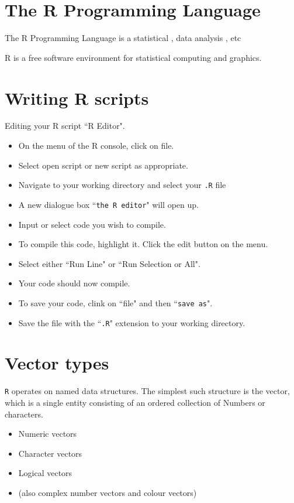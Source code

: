 \documentclass[a4paper,12pt]{article}
\begin{document}
\tableofcontents
\newpage
\section{The R Programming Language}

The R Programming Language is a statistical , data analysis , etc

R is a free software environment for statistical computing and graphics.

\section{Writing R scripts}
Editing your R script ``R Editor".
\begin{itemize}
\item On the menu of the R console, click on file.
\item Select open script or new script as appropriate.
\item Navigate to your working directory and select your \texttt{.R} file
\item A new dialogue box ``\texttt{the R editor}" will open up.
\item Input or select code you wish to compile.
\item To compile this code, highlight it. Click the edit button on the menu.
\item Select either ``Run Line" or ``Run Selection or All".
\item Your code should now compile.
\item To save your code, clink on ``file" and then ``\texttt{save as}".
\item Save the file with the ``\texttt{.R}" extension to your working directory.
\end{itemize}

\section{Vector types}
\texttt{R} operates on named data structures. The simplest such structure is the
vector, which is a single entity consisting of an ordered collection of
Numbers or characters.

\begin{itemize}
\item Numeric vectors
\item Character vectors
\item Logical vectors
\item (also complex number vectors and colour vectors)
\end{itemize}
\end{document}
